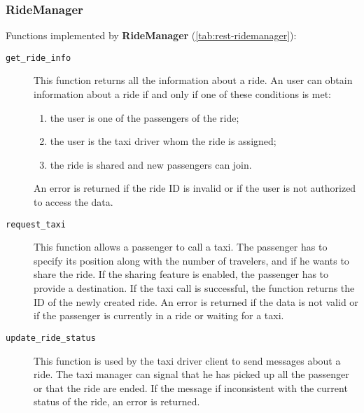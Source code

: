 \subsubsection{RideManager}
Functions implemented by \textbf{RideManager} (\autoref{tab:rest-ridemanager}):
\begin{description}
    \item[\texttt{get\_ride\_info}] This function returns all the information about a ride. An user can obtain information about a ride if and only if one of these conditions is met:
    \begin{enumerate}
        \item the user is one of the passengers of the ride;
        \item the user is the taxi driver whom the ride is assigned;
        \item the ride is shared and new passengers can join.
    \end{enumerate}
    An error is returned if the ride ID is invalid or if the user is not authorized to access the data.

    \item[\texttt{request\_taxi}] This function allows a passenger to call a taxi. The passenger has to specify its position along with the number of travelers, and if he wants to share the ride. If the sharing feature is enabled, the passenger has to provide a destination. If the taxi call is successful, the function returns the ID of the newly created ride. An error is returned if the data is not valid or if the passenger is currently in a ride or waiting for a taxi.

    \item[\texttt{update\_ride\_status}] This function is used by the taxi driver client to send messages about a ride. The taxi manager can signal that he has picked up all the passenger or that the ride are ended. If the message if inconsistent with the current status of the ride, an error is returned.
\end{description}

